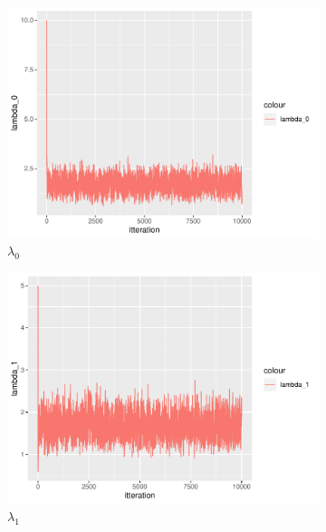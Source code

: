 \begin{figure}[h]
    \centering
    \begin{subfigure}[b]{0.49\textwidth}
        \centering
        \includegraphics[width = \textwidth]{Images/sim_lambda0.pdf}
        \caption{$\lambda_0$}
        \label{fig:burnin_lam0}
    \end{subfigure}
    \begin{subfigure}[b]{0.49\textwidth}
        \centering
        \includegraphics[width = \textwidth]{Images/sim_lambda1.pdf}
        \caption{$\lambda_1$}
        \label{fig:burnin_lam1}
    \end{subfigure}
    \begin{subfigure}[b]{0.49\textwidth}
        \centering

\end{subfigure}
\end{figure}
